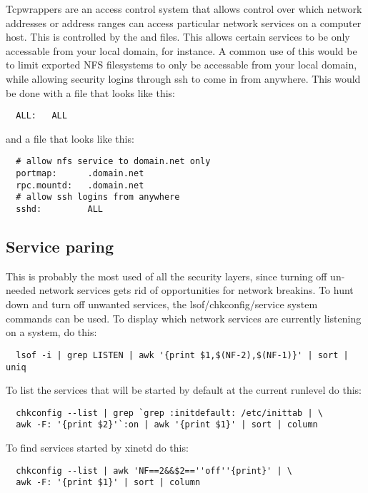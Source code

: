 Tcpwrappers are an access control system that allows control over which
network addresses or address ranges can access particular network services
on a computer host.  This is controlled by the  and
 files. This allows certain services to be only 
accessable from your local domain, for instance.  A common use of this
would be to limit exported NFS filesystems to only be accessable from
your local domain, while allowing security logins through ssh to come
in from anywhere.  This would be done with a  file 
that looks like this:

\begin{verbatim}
  ALL:   ALL
\end{verbatim}

\noindent and a  file that looks like this:

\begin{verbatim}
  # allow nfs service to domain.net only
  portmap:      .domain.net
  rpc.mountd:   .domain.net
  # allow ssh logins from anywhere
  sshd:         ALL
\end{verbatim}

\subsection{Service paring}

This is probably the most used of all the security layers, since turning off
un-needed network services gets rid of opportunities for network breakins.
To hunt down and turn off unwanted services, the lsof/chkconfig/service
system commands can be used. To display which network services are currently
listening on a system, do this:

\begin{verbatim}
  lsof -i | grep LISTEN | awk '{print $1,$(NF-2),$(NF-1)}' | sort | uniq
\end{verbatim}

\noindent To list the services that will be started by default at the current runlevel do this:

\begin{verbatim}
  chkconfig --list | grep `grep :initdefault: /etc/inittab | \
  awk -F: '{print $2}'`:on | awk '{print $1}' | sort | column
\end{verbatim}

\noindent To find services started by xinetd do this:

\begin{verbatim}
  chkconfig --list | awk 'NF==2&&$2==''off''{print}' | \
  awk -F: '{print $1}' | sort | column
\end{verbatim}


